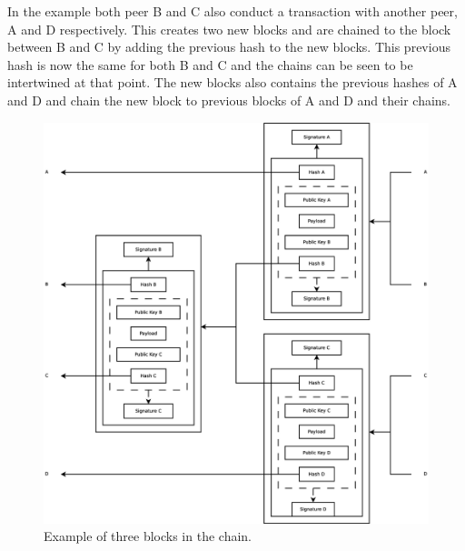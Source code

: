 In the example both peer B and C also conduct a transaction with another peer, A and D respectively.
This creates two new blocks and are chained to the block between B and C by adding the previous hash to the new blocks.
This previous hash is now the same for both B and C and the chains can be seen to be intertwined at that point.
The new blocks also contains the previous hashes of A and D
and chain the new block to previous blocks of A and D and their chains.

\begin{figure}
	\centerline{\includegraphics[scale=0.3]{design/figs/chain.eps}}
	\caption{Example of three blocks in the chain.}
	\label{fig:chain-example}
\end{figure}
